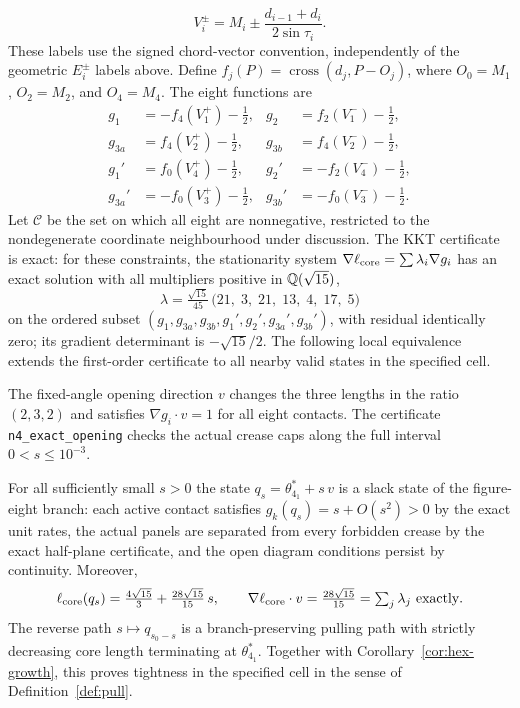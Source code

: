 \[
V_i^\pm=M_i\pm\frac{d_{i-1}+d_i}{2\sin\tau_i}.
\]
These labels use the signed chord-vector convention, independently of the geometric $E_i^\pm$ labels above. Define $f_j(P)=\operatorname{cross}(d_j,P-O_j)$, where $O_0=M_1$, $O_2=M_2$, and $O_4=M_4$. The eight functions are
\begin{align*}
g_1&=-f_4(V_1^+)-\tfrac12,& g_2&=f_2(V_1^-)-\tfrac12,\\
g_{3a}&=f_4(V_2^+)-\tfrac12,&g_{3b}&=f_4(V_2^-)-\tfrac12,\\
g_1'&=f_0(V_4^+)-\tfrac12,&g_2'&=-f_2(V_4^-)-\tfrac12,\\
g_{3a}'&=-f_0(V_3^+)-\tfrac12,&g_{3b}'&=-f_0(V_3^-)-\tfrac12.
\end{align*}
Let $\mathcal C$ be the set on which all eight are nonnegative, restricted to the nondegenerate coordinate neighbourhood under discussion. The KKT certificate is exact: for these constraints, the stationarity system $\nabla\ell_{\mathrm{core}}=\sum\lambda_i\nabla g_i$ has an exact solution with all multipliers positive in $\mathbb{Q}(\sqrt{15})$,
\[
\lambda=\tfrac{\sqrt{15}}{45}\,\big(21,\;3,\;21,\;13,\;4,\;17,\;5\big)
\]
on the ordered subset $(g_1,g_{3a},g_{3b},g_1',g_2',g_{3a}',g_{3b}')$, with residual identically zero; its gradient determinant is $-\sqrt{15}/2$. The following local equivalence extends the first-order certificate to all nearby valid states in the specified cell.



The fixed-angle opening direction $v$ changes the three lengths in the ratio $(2,3,2)$ and satisfies $\nabla g_i\cdot v=1$ for all eight contacts. The certificate \texttt{n4\_exact\_opening} checks the actual crease caps along the full interval $0<s\le10^{-3}$.

\begin{lemma}\label{lem:slackstart41}
For all sufficiently small $s>0$ the state $q_s=\theta^*_{4_1}+s\,v$ is a slack state of the figure-eight branch: each active contact satisfies $g_k(q_s)=s+O(s^2)>0$ by the exact unit rates, the actual panels are separated from every forbidden crease by the exact half-plane certificate, and the open diagram conditions persist by continuity. Moreover,
\[\core(q_s)=\tfrac{4\sqrt{15}}3+\tfrac{28\sqrt{15}}{15}\,s,\qquad \nabla\core\cdot v=\tfrac{28\sqrt{15}}{15}=\textstyle\sum_j\lambda_j\ \text{exactly}.\]
The reverse path $s\mapsto q_{s_0-s}$ is a branch-preserving pulling path with strictly decreasing core length terminating at $\theta^*_{4_1}$. Together with Corollary~\ref{cor:hex-growth}, this proves tightness in the specified cell in the sense of Definition~\ref{def:pull}.
\end{lemma}

